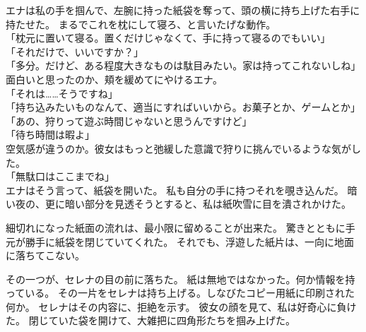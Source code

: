 \documentclass[../IHMain]{subfiles}
\begin{document}
エナは私の手を掴んで、左腕に持った紙袋を奪って、頭の横に持ち上げた右手に持たせた。
まるでこれを枕にして寝ろ、と言いたげな動作。\\
「枕元に置いて寝る。置くだけじゃなくて、手に持って寝るのでもいい」\\
「それだけで、いいですか？」\\
「多分。だけど、ある程度大きなものは駄目みたい。家は持ってこれないしね」\\
面白いと思ったのか、頬を緩めてにやけるエナ。\\
「それは……そうですね」\\
「持ち込みたいものなんて、適当にすればいいから。お菓子とか、ゲームとか」\\
「あの、狩りって遊ぶ時間じゃないと思うんですけど」\\
「待ち時間は暇よ」\\
空気感が違うのか。彼女はもっと弛緩した意識で狩りに挑んでいるような気がした。\\
「無駄口はここまでね」\\
エナはそう言って、紙袋を開いた。
私も自分の手に持つそれを覗き込んだ。
暗い夜の、更に暗い部分を見透そうとすると、私は紙吹雪に目を潰されかけた。

細切れになった紙面の流れは、最小限に留めることが出来た。
驚きとともに手元が勝手に紙袋を閉じていてくれた。
それでも、浮遊した紙片は、一向に地面に落ちてこない。

その一つが、セレナの目の前に落ちた。
紙は無地ではなかった。何か情報を持っている。
その一片をセレナは持ち上げる。しなびたコピー用紙に印刷された何か。
セレナはその内容に、拒絶を示す。
彼女の顔を見て、私は好奇心に負けた。
閉じていた袋を開けて、大雑把に四角形たちを掴み上げた。
\end{document}
